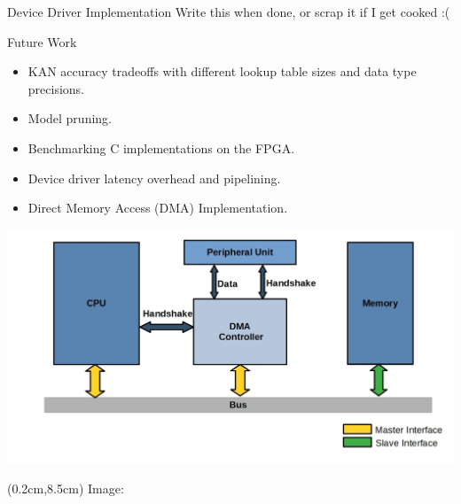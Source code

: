 \documentclass[aspectratio=169,xcolor=dvipsnames]{beamer}
\begin{document}
\begin{frame}{Device Driver Implementation}
    Write this when done, or scrap it if I get cooked :(

\end{frame}

\begin{frame}{Future Work}
    \begin{itemize}
        \item KAN accuracy tradeoffs with different lookup table sizes and data type precisions.
        \item Model pruning.
        \item Benchmarking C implementations on the FPGA.
        \item Device driver latency overhead and pipelining. %
        \item Direct Memory Access (DMA) Implementation.
    \end{itemize}
    \centering
    \includegraphics[scale=0.17]{dma-diagram.jpg}

    \begin{textblock*}{5cm}(0.2cm,8.5cm)
        \tiny Image: \cite{dma}
    \end{textblock*}
    
    
\end{frame}
\end{document}
